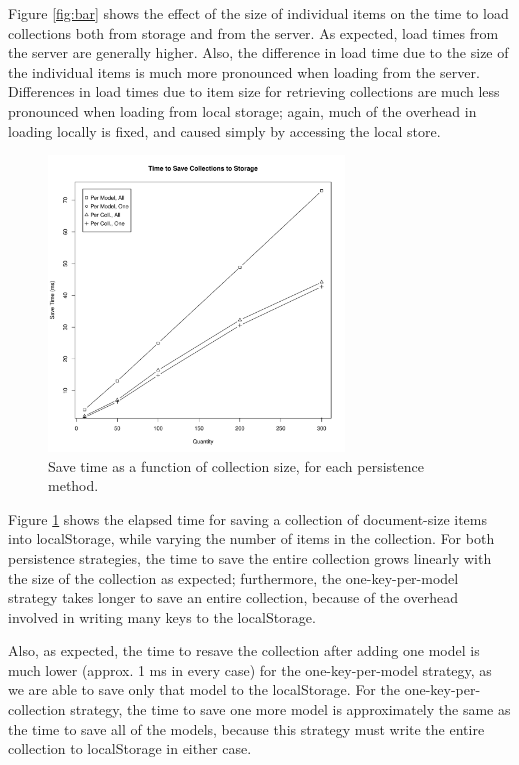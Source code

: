 \documentclass[12pt]{article}
\begin{document}
Figure \ref{fig:bar} shows the effect of the size of individual items on the
time to load collections both from storage and from the server. As expected,
load times from the server are generally higher. Also, the difference in load
time due to the size of the individual items is much more pronounced when
loading from the server. Differences in load times due to item size for
retrieving collections are much less pronounced when loading from local
storage; again, much of the overhead in loading locally is fixed, and caused
simply by accessing the local store.

\begin{figure}[th]
    \centering
    \includegraphics[width=0.7\textwidth]{save.pdf}
    \caption{Save time as a function of collection size, for each persistence
    method.}
    \label{fig:save}
\end{figure}

Figure \ref{fig:save} shows the elapsed time for saving a collection of
document-size items into localStorage, while varying the number of items in the
collection. For both persistence strategies, the time to save the entire
collection grows linearly with the size of the collection as expected;
furthermore, the one-key-per-model strategy takes longer to save an entire
collection, because of the overhead involved in writing many keys to the
localStorage.

Also, as expected, the time to resave the collection after adding one model is
much lower (approx. 1 ms in every case) for the one-key-per-model strategy, as
we are able to save only that model to the localStorage. For the
one-key-per-collection strategy, the time to save one more model is
approximately the same as the time to save all of the models, because this
strategy must write the entire collection to localStorage in either case.
\end{document}
